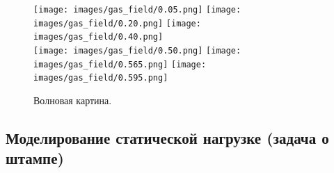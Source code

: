 \begin{figure}[H]
    \centering
    \texttt{[image: images/gas\_field/0.05.png]}
    \texttt{[image: images/gas\_field/0.20.png]}
    \texttt{[image: images/gas\_field/0.40.png]}\\
    \texttt{[image: images/gas\_field/0.50.png]}
    \texttt{[image: images/gas\_field/0.565.png]}
    \texttt{[image: images/gas\_field/0.595.png]}
    \caption{Волновая картина.}
    \label{fig:wave_image}
\end{figure}

\subsection{Моделирование статической нагрузке (задача о штампе)}
